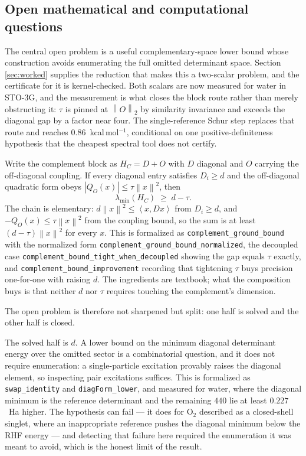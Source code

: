 \documentclass[11pt,a4paper]{article}
\theoremstyle{plain}
\theoremstyle{definition}
\theoremstyle{remark}
\newcommand{\norm}[1]{\left\lVert #1\right\rVert}
\newcommand{\ip}[2]{\left\langle #1,#2\right\rangle}
\providecommand{\path}[1]{\texttt{#1}}
\begin{document}
\subsection{Open mathematical and computational questions}
The central open problem is a useful complementary-space lower bound whose
construction avoids enumerating the full omitted determinant space. Section
\ref{sec:worked} supplies the reduction that makes this a two-scalar problem, and
the certificate for it is kernel-checked. Both scalars are now measured for water
in STO-3G, and the measurement is what closes the block route rather than merely
obstructing it: $\tau$ is pinned at $\norm{O}_2$ by similarity invariance and
exceeds the diagonal gap by a factor near four. The single-reference Schur step
replaces that route and reaches $0.86$~kcal\,mol$^{-1}$, conditional on one
positive-definiteness hypothesis that the cheapest spectral tool does not certify.

Write the complement block as $H_C = D + O$ with $D$ diagonal and $O$ carrying the
off-diagonal coupling. If every diagonal entry satisfies $D_i \ge d$ and the
off-diagonal quadratic form obeys $|Q_O(x)| \le \tau\norm{x}^2$, then
\[
  \lambda_{\min}(H_C) \;\ge\; d - \tau .
\]
The chain is elementary: $d\norm{x}^2 \le \ip{x}{Dx}$ from $D_i \ge d$, and
$-Q_O(x) \le \tau\norm{x}^2$ from the coupling bound, so the sum is at least
$(d-\tau)\norm{x}^2$ for every $x$. This is formalized as
\path{complement_ground_bound} with the normalized form
\path{complement_ground_bound_normalized}, the decoupled case
\path{complement_bound_tight_when_decoupled} showing the gap equals $\tau$ exactly,
and \path{complement_bound_improvement} recording that tightening $\tau$ buys
precision one-for-one with raising $d$. The ingredients are textbook; what the
composition buys is that neither $d$ nor $\tau$ requires touching the
complement's dimension.

The open problem is therefore not sharpened but split: one half is solved and the
other half is closed.

The solved half is $d$. A lower bound on the minimum diagonal determinant energy
over the omitted sector is a combinatorial question, and it does not require
enumeration: a single-particle excitation provably raises the diagonal element, so
inspecting pair excitations suffices. This is formalized as \path{swap_identity} and
\path{diagForm_lower}, and measured for water, where the diagonal minimum is the
reference determinant and the remaining $440$ lie at least $0.227$~Ha higher. The
hypothesis can fail --- it does for O$_2$ described as a closed-shell singlet, where
an inappropriate reference pushes the diagonal minimum below the RHF energy --- and
detecting that failure here required the enumeration it was meant to avoid, which is
the honest limit of the result.
\end{document}
